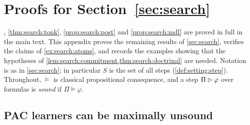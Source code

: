 \providecommand{\Steps}{\mathrm{Steps}}

\section{Proofs for Section~\ref{sec:search}}\label{app:search}

, \cref{thm:search:tonk}, \cref{prop:search:post} and \cref{prop:search:mdl} are proved in full in the main text. This appendix proves the remaining results of \cref{sec:search}, verifies the claims of \cref{ex:search:atoms}, and records the examples showing that the hypotheses of \cref{lem:search:commitment,thm:search:doctrinal} are needed. Notation is as in \cref{sec:search}; in particular $S$ is the set of all steps (\cref{def:setting:step}). Throughout, $\models$ is classical propositional consequence, and a step $\Pi\rhd\varphi$ over formulas is \emph{sound} if $\Pi\models\varphi$.

\subsection{PAC learners can be maximally unsound}\label{app:search:pac}

